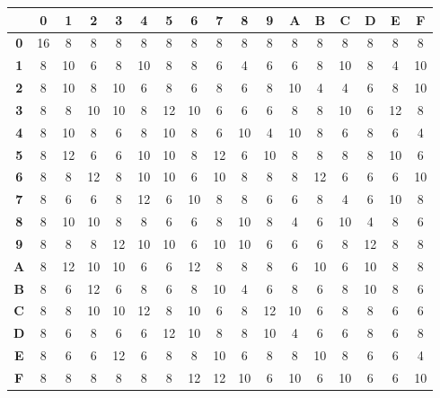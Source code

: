 \documentclass{article}
\begin{document}
\begin{enumerate}
    \begin{tabular}{|>{\bfseries}c|*{16}c|}
        \hline
        & \textbf{0} & \textbf{1} & \textbf{2} & \textbf{3}
        & \textbf{4} & \textbf{5} & \textbf{6} & \textbf{7}
        & \textbf{8} & \textbf{9} & \textbf{A} & \textbf{B}
        & \textbf{C} & \textbf{D} & \textbf{E} & \textbf{F} \\ \hline
        0   & 16 & 8  & 8  & 8  & 8  & 8  & 8  & 8
            & 8  & 8  & 8  & 8  & 8  & 8  & 8  & 8          \\ \hline
        1   & 8  & 10 & 6  & 8  & 10 & 8  & 8  & 6
            & 4  & 6  & 6  & 8  & 10 & 8  & 4  & 10         \\ \hline
        2   & 8  & 10 & 8  & 10 & 6  & 8  & 6  & 8
            & 6  & 8  & 10 & 4  & 4  & 6  & 8  & 10         \\ \hline
        3   & 8  & 8  & 10 & 10 & 8  & 12 & 10 & 6
            & 6  & 6  & 8  & 8  & 10 & 6  & 12 & 8          \\ \hline
        4   & 8  & 10 & 8  & 6  & 8  & 10 & 8  & 6
            & 10 & 4  & 10 & 8  & 6  & 8  & 6  & 4          \\ \hline
        5   & 8  & 12 & 6  & 6  & 10 & 10 & 8  & 12
            & 6  & 10 & 8  & 8  & 8  & 8  & 10 & 6          \\ \hline
        6   & 8  & 8  & 12 & 8  & 10 & 10 & 6  & 10
            & 8  & 8  & 8  & 12 & 6  & 6  & 6  & 10         \\ \hline
        7   & 8  & 6  & 6  & 8  & 12 & 6  & 10 & 8
            & 8  & 6  & 6  & 8  & 4  & 6  & 10 & 8          \\ \hline
        8   & 8  & 10 & 10 & 8  & 8  & 6  & 6  & 8
            & 10 & 8  & 4  & 6  & 10 & 4  & 8  & 6          \\ \hline
        9   & 8  & 8  & 8  & 12 & 10 & 10 & 6  & 10
            & 10 & 6  & 6  & 6  & 8  & 12 & 8  & 8          \\ \hline
        A   & 8  & 12 & 10 & 10 & 6  & 6  & 12 & 8
            & 8  & 8  & 6  & 10 & 6  & 10 & 8  & 8          \\ \hline
        B   & 8  & 6  & 12 & 6  & 8  & 6  & 8  & 10
            & 4  & 6  & 8  & 6  & 8  & 10 & 8  & 6          \\ \hline
        C   & 8  & 8  & 10 & 10 & 12 & 8  & 10 & 6
            & 8  & 12 & 10 & 6  & 8  & 8  & 6  & 6          \\ \hline
        D   & 8  & 6  & 8  & 6  & 6  & 12 & 10 & 8
            & 8  & 10 & 4  & 6  & 6  & 8  & 6  & 8          \\ \hline
        E   & 8  & 6  & 6  & 12 & 6  & 8  & 8  & 10
            & 6  & 8  & 8  & 10 & 8  & 6  & 6  & 4          \\ \hline
        F   & 8  & 8  & 8  & 8  & 8  & 8  & 12 & 12
            & 10 & 6  & 10 & 6  & 10 & 6  & 6  & 10         \\ \hline
    \end{tabular}


\end{enumerate}
\end{document}
